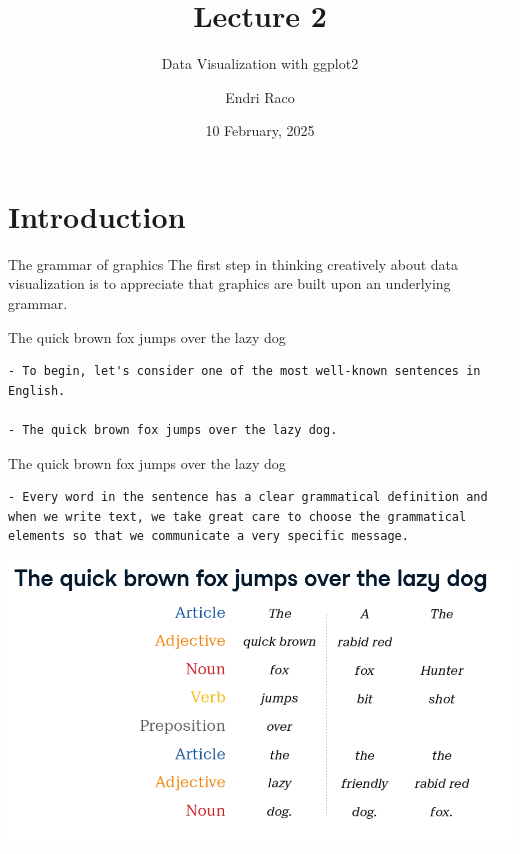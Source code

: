 \documentclass[
  ignorenonframetext,
]{beamer}
\title{Lecture 2}
\subtitle{Data Visualization with ggplot2}
\author{Endri Raco}
\date{10 February, 2025}
\begin{document}
\frame{\titlepage}

\begin{frame}[allowframebreaks]
  \tableofcontents[hideallsubsections]
\end{frame}
\section{Introduction}\label{introduction}

\begin{frame}{The grammar of graphics}
\label{the-grammar-of-graphics}
The first step in thinking creatively about data visualization is to
appreciate that graphics are built upon an underlying grammar.
\end{frame}

\begin{frame}[fragile]{The quick brown fox jumps over the lazy dog}
\label{the-quick-brown-fox-jumps-over-the-lazy-dog}
\begin{verbatim}
- To begin, let's consider one of the most well-known sentences in English. 

- The quick brown fox jumps over the lazy dog.
\end{verbatim}
\end{frame}

\begin{frame}[fragile]{The quick brown fox jumps over the lazy dog}
\label{the-quick-brown-fox-jumps-over-the-lazy-dog-1}
\begin{verbatim}
- Every word in the sentence has a clear grammatical definition and when we write text, we take great care to choose the grammatical elements so that we communicate a very specific message. 
\end{verbatim}

\includegraphics{../images/im120.png}
\end{frame}
\end{document}
